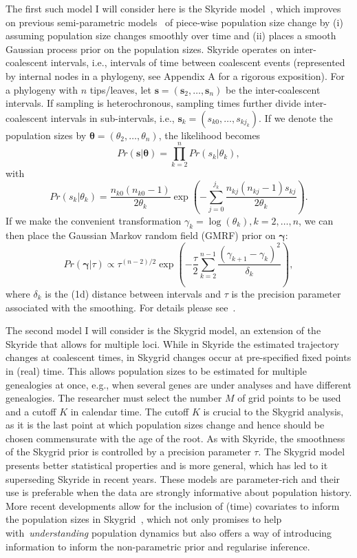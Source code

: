 The first such model I will consider here is the Skyride model~\citep{Minin2008}, which improves on previous semi-parametric models~\citep{Pybus2000} of piece-wise population size change by (i) assuming population size changes smoothly over time and (ii) places a smooth Gaussian process prior on the population sizes.
Skyride operates on inter-coalescent intervals, i.e., intervals of time between coalescent events (represented by internal nodes in a phylogeny, see Appendix A for a rigorous exposition).
For a phylogeny with $n$ tips/leaves, let $\boldsymbol s = ( \boldsymbol s_2, \ldots, \boldsymbol s_n )$ be the inter-coalescent intervals.
If sampling is heterochronous, sampling times further divide inter-coalescent intervals in sub-intervals, i.e., $\boldsymbol s_k = (s_{k0}, \ldots, s_{kj_{k}} ) $.
If we denote the population sizes by $\boldsymbol \theta = ( \theta_2, \ldots, \theta_n )$, the likelihood becomes 
$$ Pr(\boldsymbol s | \boldsymbol \theta) = \prod_{k = 2}^n Pr(s_k | \theta_k), $$
with
$$ Pr(s_k | \theta_k) = \frac{n_{k0} (n_{k0} - 1)}{2\theta_k} \exp\left( - \sum_{j=0}^{j_{k}} \frac{ n_{kj} (n_{kj} - 1)s_{kj} }{2\theta_k}\right). $$
If we make the convenient transformation $\gamma_k = \log(\theta_k), k = 2, \ldots, n $, we can then place the Gaussian Markov random field (GMRF) prior on $\boldsymbol \gamma $:
$$ Pr(\boldsymbol \gamma | \tau ) \propto \tau^{(n-2)/2} \exp\left(- \frac{\tau}{2} \sum_{k = 2}^{n-1} \frac{(\gamma_{k + 1} -\gamma_k)^2}{\delta_k} \right), $$
where $\delta_k$ is the (1d) distance between intervals and $\tau$ is the precision parameter associated with the smoothing.
For details please see~\cite{Minin2008}.

The second model I will consider is the Skygrid model, an extension of the Skyride that allows for multiple loci.
While in Skyride the estimated trajectory changes at coalescent times, in Skygrid changes occur at pre-specified fixed points in (real) time.
This allows population sizes to be estimated for multiple genealogies at once, e.g., when several genes are under analyses and have different genealogies.
The researcher must select the number $M$ of grid points to be used and a cutoff $K$ in calendar time.
The cutoff $ K $ is crucial to the Skygrid analysis, as it is the last point at which population sizes change and hence should be chosen commensurate with the age of the root.
As with Skyride, the smoothness of the Skygrid prior is controlled by a precision parameter $\tau$.
The Skygrid model presents better statistical properties and is more general, which has led to it superseding Skyride in recent years.
These models are parameter-rich and their use is preferable when the data are strongly informative about population history.
More recent developments allow for the inclusion of (time) covariates to inform the population sizes in Skygrid~\citep{Gill2016}, which not only promises to help with~\textit{understanding} population dynamics but also offers a way of introducing information to inform the non-parametric prior and regularise inference.


